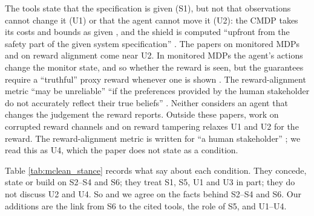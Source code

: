 \documentclass{article}
\begin{document}
The tools state that the specification is given (S1), but not that observations cannot change it (U1) or that the agent cannot move it (U2): the CMDP takes its costs and bounds as given \citep{altman1999}, and the shield is computed ``upfront from the safety part of the given system specification'' \citep{alshiekh2018}. The papers on monitored MDPs and on reward alignment come near U2. In monitored MDPs the agent's actions change the monitor state, and so whether the reward is seen, but the guarantees require a ``truthful'' proxy reward whenever one is shown \citep{mohammedalamen2025b}. The reward-alignment metric ``may be unreliable'' \citep{muslimani2025} ``if the preferences provided by the human stakeholder do not accurately reflect their true beliefs'' \citep{muslimani2025}. Neither considers an agent that changes the judgement the reward reports. Outside these papers, work on corrupted reward channels \citep{everitt2017} and on reward tampering \citep{everitt2021} relaxes U1 and U2 for the reward. The reward-alignment metric is written for ``a human stakeholder'' \citep{muslimani2025}; we read this as U4, which the paper does not state as a condition.

Table \ref{tab:mclean_stance} records what \citet{mclean2026} say about each condition. They concede, state or build on S2--S4 and S6; they treat S1, S5, U1 and U3 in part; they do not discuss U2 and U4. So \citet{mclean2026} and we agree on the facts behind S2--S4 and S6. Our additions are the link from S6 to the cited tools, the role of S5, and U1--U4.
\end{document}
